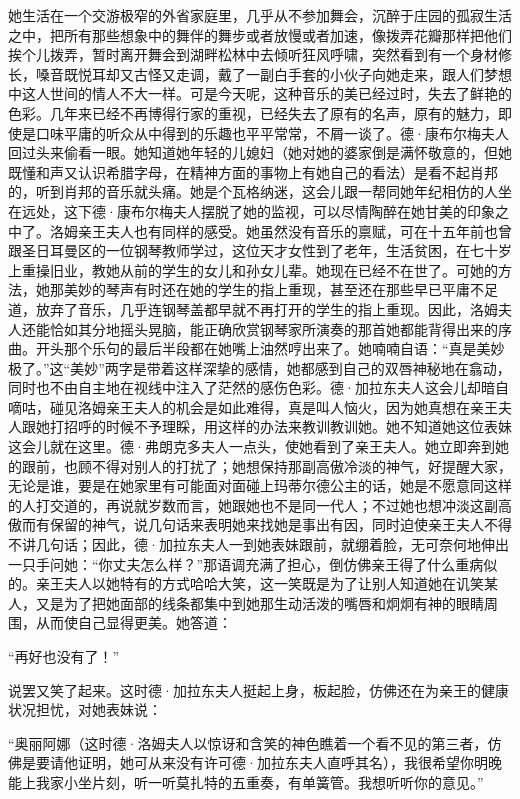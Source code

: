 \par 她生活在一个交游极窄的外省家庭里，几乎从不参加舞会，沉醉于庄园的孤寂生活之中，把所有那些想象中的舞伴的舞步或者放慢或者加速，像拨弄花瓣那样把他们挨个儿拨弄，暂时离开舞会到湖畔松林中去倾听狂风呼啸，突然看到有一个身材修长，嗓音既悦耳却又古怪又走调，戴了一副白手套的小伙子向她走来，跟人们梦想中这人世间的情人不大一样。可是今天呢，这种音乐的美已经过时，失去了鲜艳的色彩。几年来已经不再博得行家的重视，已经失去了原有的名声，原有的魅力，即使是口味平庸的听众从中得到的乐趣也平平常常，不屑一谈了。德·康布尔梅夫人回过头来偷看一眼。她知道她年轻的儿媳妇（她对她的婆家倒是满怀敬意的，但她既懂和声又认识希腊字母，在精神方面的事物上有她自己的看法）是看不起肖邦的，听到肖邦的音乐就头痛。她是个瓦格纳迷，这会儿跟一帮同她年纪相仿的人坐在远处，这下德·康布尔梅夫人摆脱了她的监视，可以尽情陶醉在她甘美的印象之中了。洛姆亲王夫人也有同样的感受。她虽然没有音乐的禀赋，可在十五年前也曾跟圣日耳曼区的一位钢琴教师学过，这位天才女性到了老年，生活贫困，在七十岁上重操旧业，教她从前的学生的女儿和孙女儿辈。她现在已经不在世了。可她的方法，她那美妙的琴声有时还在她的学生的指上重现，甚至还在那些早已平庸不足道，放弃了音乐，几乎连钢琴盖都早就不再打开的学生的指上重现。因此，洛姆夫人还能恰如其分地摇头晃脑，能正确欣赏钢琴家所演奏的那首她都能背得出来的序曲。开头那个乐句的最后半段都在她嘴上油然哼出来了。她喃喃自语：“真是美妙极了。”这“美妙”两字是带着这样深挚的感情，她都感到自己的双唇神秘地在翕动，同时也不由自主地在视线中注入了茫然的感伤色彩。德·加拉东夫人这会儿却暗自嘀咕，碰见洛姆亲王夫人的机会是如此难得，真是叫人恼火，因为她真想在亲王夫人跟她打招呼的时候不予理睬，用这样的办法来教训教训她。她不知道她这位表妹这会儿就在这里。德·弗朗克多夫人一点头，使她看到了亲王夫人。她立即奔到她的跟前，也顾不得对别人的打扰了；她想保持那副高傲冷淡的神气，好提醒大家，无论是谁，要是在她家里有可能面对面碰上玛蒂尔德公主的话，她是不愿意同这样的人打交道的，再说就岁数而言，她跟她也不是同一代人；不过她也想冲淡这副高傲而有保留的神气，说几句话来表明她来找她是事出有因，同时迫使亲王夫人不得不讲几句话；因此，德·加拉东夫人一到她表妹跟前，就绷着脸，无可奈何地伸出一只手问她：“你丈夫怎么样？”那语调充满了担心，倒仿佛亲王得了什么重病似的。亲王夫人以她特有的方式哈哈大笑，这一笑既是为了让别人知道她在讥笑某人，又是为了把她面部的线条都集中到她那生动活泼的嘴唇和炯炯有神的眼睛周围，从而使自己显得更美。她答道：
\par “再好也没有了！”
\par 说罢又笑了起来。这时德·加拉东夫人挺起上身，板起脸，仿佛还在为亲王的健康状况担忧，对她表妹说：
\par “奥丽阿娜（这时德·洛姆夫人以惊讶和含笑的神色瞧着一个看不见的第三者，仿佛是要请他证明，她可从来没有许可德·加拉东夫人直呼其名），我很希望你明晚能上我家小坐片刻，听一听莫扎特的五重奏，有单簧管。我想听听你的意见。”
